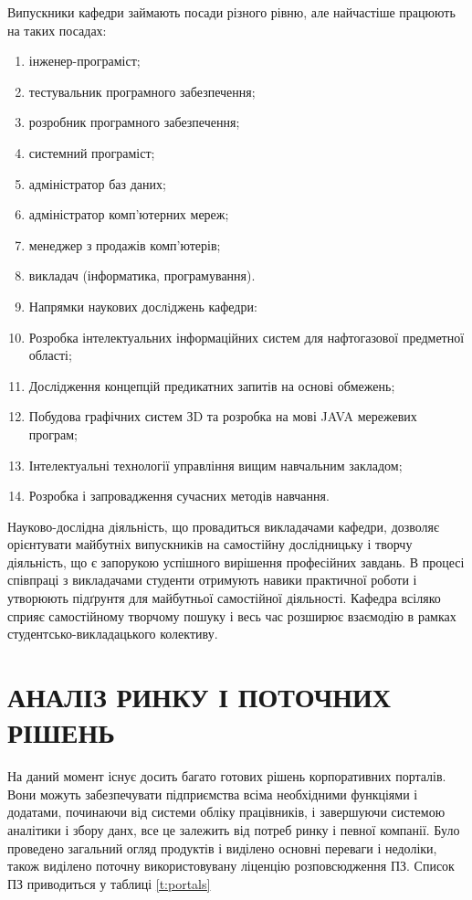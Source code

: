 Випускники кафедри займають посади різного рівню, але найчастіше працюють на таких посадах:
\begin{enumerate}
\item інженер-програміст;
\item тестувальник програмного забезпечення;
\item розробник програмного забезпечення;
\item системний програміст;
\item адміністратор баз даних;
\item адміністратор комп'ютерних мереж;
\item менеджер з продажів комп'ютерів;
\item викладач (інформатика, програмування).
\item Напрямки наукових дослiджень кафедри:
\item Розробка інтелектуальних інформаційних систем для нафтогазової предметної області;
\item Дослідження концепцій предикатних запитів на основі обмежень;
\item Побудова графічних систем ЗD та розробка на мові JAVA мережевих програм;
\item Інтелектуальні технології управління вищим навчальним закладом;
\item Розробка і запровадження сучасних методів навчання.
\end{enumerate}

Науково-дослідна діяльність, що провадиться викладачами кафедри, дозволяє орієнтувати майбутніх випускників на самостійну дослідницьку і творчу діяльність, що є запорукою успішного вирішення професійних завдань. В процесі співпраці з викладачами студенти отримують навики практичної роботи і утворюють підґрунтя для майбутньої самостійної діяльності. Кафедра всіляко сприяє самостійному творчому пошуку і весь час розширює взаємодію в рамках студентсько-викладацького колективу.

\section{АНАЛІЗ РИНКУ І ПОТОЧНИХ РІШЕНЬ}
На даний момент існує досить багато готових рішень корпоративних порталів. 
Вони можуть забезпечувати підприємства всіма необхідними функціями і додатами, починаючи від системи обліку працівників, і завершуючи системою аналітики і збору данх, все це залежить від потреб ринку і певної компанії.
Було проведено загальний огляд продуктів і виділено основні переваги і недоліки, також виділено поточну використовувану ліценцію розповсюдження ПЗ.
Список ПЗ приводиться у таблиці \ref{t:portals}

